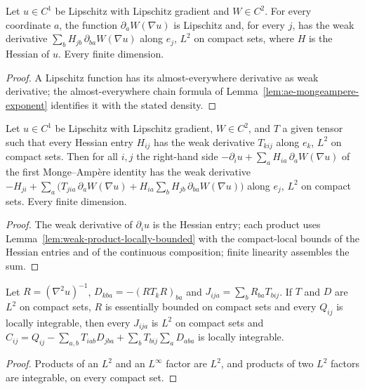 \begin{lemma}
  \label{lem:weak-gradient-derivative-composition}
  \leanok
  Let $u\in C^1$ be Lipschitz with Lipschitz gradient and $W\in C^2$. For every coordinate $a$, the function $\partial_aW(\nabla u)$ is
  Lipschitz and, for every $j$, has the weak derivative $\sum_bH_{jb}\,\partial_{ba}W(\nabla u)$ along $e_j$, $L^2$ on compact sets,
  where $H$ is the Hessian of $u$. Every finite dimension.
\end{lemma}
\begin{proof}
  \leanok
  A Lipschitz function has its almost-everywhere derivative as weak derivative; the almost-everywhere chain formula of
  Lemma~\ref{lem:ae-mongeampere-exponent} identifies it with the stated density.
\end{proof}

\begin{lemma}
  \label{lem:weak-monge-ampere-first-rhs}
  \leanok
  Let $u\in C^1$ be Lipschitz with Lipschitz gradient, $W\in C^2$, and $T$ a given tensor such that every Hessian entry $H_{ij}$ has
  the weak derivative $T_{kij}$ along $e_k$, $L^2$ on compact sets. Then for all $i,j$ the right-hand side
  $-\partial_iu+\sum_aH_{ia}\,\partial_aW(\nabla u)$ of the first Monge--Amp\`ere identity has the weak derivative
  $-H_{ji}+\sum_a\big(T_{jia}\,\partial_aW(\nabla u)+H_{ia}\sum_bH_{jb}\,\partial_{ba}W(\nabla u)\big)$ along $e_j$, $L^2$ on compact
  sets. Every finite dimension.
\end{lemma}
\begin{proof}
  \leanok
  The weak derivative of $\partial_iu$ is the Hessian entry; each product uses Lemma~\ref{lem:weak-product-locally-bounded} with the
  compact-local bounds of the Hessian entries and of the continuous composition; finite linearity assembles the sum.
\end{proof}

\begin{lemma}
  \label{lem:weak-hessian-flux-forcing-local}
  \leanok
  Let $R=(\nabla^2u)^{-1}$, $D_{kba}=-(RT_kR)_{ba}$ and $J_{ija}=\sum_bR_{ba}T_{bij}$. If $T$ and $D$ are $L^2$ on compact sets, $R$ is
  essentially bounded on compact sets and every $Q_{ij}$ is locally integrable, then every $J_{ija}$ is $L^2$ on compact sets and
  $C_{ij}=Q_{ij}-\sum_{a,b}T_{iab}D_{jba}+\sum_bT_{bij}\sum_aD_{aba}$ is locally integrable.
\end{lemma}
\begin{proof}
  \leanok
  Products of an $L^2$ and an $L^\infty$ factor are $L^2$, and products of two $L^2$ factors are integrable, on every compact set.
\end{proof}

